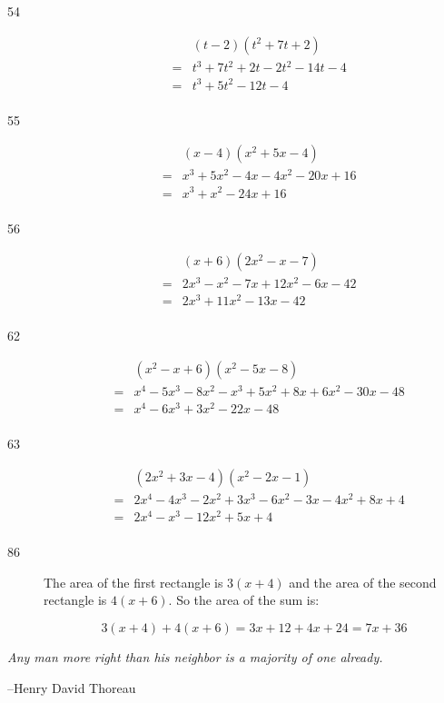 \documentclass[fleqn,addpoints]{exam}
\begin{document}
\begin{description}
\item[54]
\begin{eqnarray*}
  && (t - 2)(t^2 + 7t + 2) \\
  &=& t^3 + 7t^2 + 2t - 2t^2 - 14t - 4 \\
  &=& t^3 + 5t^2 - 12t - 4 \\
\end{eqnarray*}

\item[55]
\begin{eqnarray*}
  && (x - 4)(x^2 + 5x -4) \\
  &=& x^3 + 5x^2 - 4x - 4x^2 - 20x + 16 \\
  &=& x^3 + x^2 - 24x + 16 \\
\end{eqnarray*}

\item[56]
\begin{eqnarray*}
  && (x+6)(2x^2 - x - 7) \\
  &=& 2x^3 - x^2 - 7x + 12x^2 - 6x - 42 \\
  &=& 2x^3 + 11x^2 - 13x - 42 \\
\end{eqnarray*}

\item[62]
\begin{eqnarray*}
  && (x^2 - x + 6)(x^2 - 5x - 8) \\
  &=& x^4 - 5x^3 - 8x^2 - x^3 + 5x^2 + 8x + 6x^2 - 30x - 48 \\
  &=& x^4 - 6x^3 + 3x^2 - 22x - 48 \\
\end{eqnarray*}

\item[63]
\begin{eqnarray*}
  && (2x^2 + 3x - 4)(x^2 - 2x - 1) \\
  &=& 2x^4 - 4x^3 - 2x^2 + 3x^3 - 6x^2 - 3x - 4x^2 + 8x + 4 \\
  &=& 2x^4 - x^3 - 12x^2 + 5x + 4 \\
\end{eqnarray*}

\item[86]

The area of the first rectangle is \( 3(x + 4) \) and the area of the second rectangle is \( 4(x + 6) \).
  So the area of the sum is:

\[ 3(x + 4) + 4(x + 6) = 3x + 12 + 4x + 24 = 7x + 36 \]

\end{description}

\else


\vspace{6 cm}

{\em Any man more right than his neighbor is a majority of one already.}

\vspace{0.2 cm}
\hspace{1 cm} --Henry David Thoreau

\fi
\end{document}
